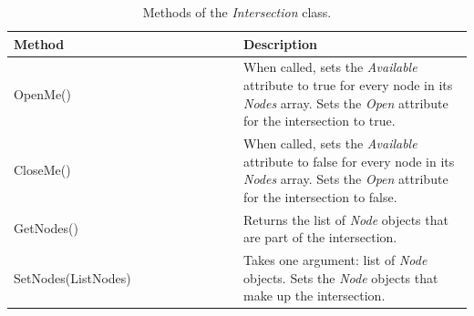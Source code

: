 \documentclass[12pt]{article}
\begin{document}
\def\arraystretch{1.5}
\begin{table}
  \centering
    \begin{tabular}{p{0.5\linewidth}p{0.5\linewidth}}
     \hline
     Method & Description \\
     \hline
     OpenMe()  & When called, sets the \textit{Available} attribute to
                 true for every node in its \textit{Nodes} array. Sets the
                 \textit{Open} attribute for the intersection to true. \\
     CloseMe() & When called, sets the \textit{Available} attribute to
                 false for every node in its \textit{Nodes} array. Sets the
                 \textit{Open} attribute for the intersection to false. \\
     GetNodes() & Returns the list of \textit{Node} objects that are part of the
                  intersection. \\
     SetNodes(ListNodes) & Takes one argument: list of \textit{Node} objects.
                           Sets the \textit{Node} objects that make up the
                           intersection. \\
     \hline
    \end{tabular}
    \caption{Methods of the \textit{Intersection} class.}
    \label{table:intersection_methods}
\end{table}

{}

\end{document}
